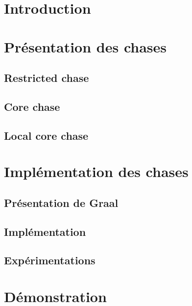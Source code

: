 \documentclass[utf8]{beamer}
\begin{document}
\maketitle


\section{Introduction}
    

\section{Présentation des chases}
    
    \subsection{Restricted chase}
        
    \subsection{Core chase}
        
    \subsection{Local core chase}
        
\section{Implémentation des chases}
    \subsection{Présentation de Graal}
        
    \subsection{Implémentation}
        
    \subsection{Expérimentations}
        
\section{Démonstration}
    
\end{document}
